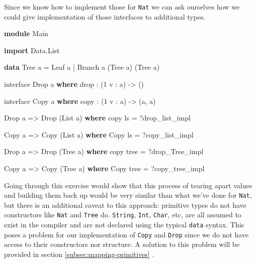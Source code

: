 \documentclass[
]{article}
\newenvironment{Shaded}{}{}
\newcommand{\DataTypeTok}[1]{\textcolor[rgb]{0.56,0.13,0.00}{#1}}
\newcommand{\DecValTok}[1]{\textcolor[rgb]{0.25,0.63,0.44}{#1}}
\newcommand{\FunctionTok}[1]{\textcolor[rgb]{0.02,0.16,0.49}{#1}}
\newcommand{\KeywordTok}[1]{\textcolor[rgb]{0.00,0.44,0.13}{\textbf{#1}}}
\newcommand{\NormalTok}[1]{#1}
\newcommand{\OperatorTok}[1]{\textcolor[rgb]{0.40,0.40,0.40}{#1}}
\newcommand{\OtherTok}[1]{\textcolor[rgb]{0.00,0.44,0.13}{#1}}
\begin{document}
Since we know how to implement those for \texttt{Nat} we can ask
ourselves how we could give implementation of those interfaces to
additional types.

\begin{Shaded}
\begin{Highlighting}[]
\KeywordTok{module} \DataTypeTok{Main}

\KeywordTok{import} \DataTypeTok{Data.List}

\KeywordTok{data} \DataTypeTok{Tree}\NormalTok{ a }\OtherTok{=} \DataTypeTok{Leaf}\NormalTok{ a }\OperatorTok{|} \DataTypeTok{Branch}\NormalTok{ a (}\DataTypeTok{Tree}\NormalTok{ a) (}\DataTypeTok{Tree}\NormalTok{ a)}

\NormalTok{interface }\DataTypeTok{Drop}\NormalTok{ a }\KeywordTok{where}
    \FunctionTok{drop} \OperatorTok{:}\NormalTok{ (}\DecValTok{1}\NormalTok{ v }\OperatorTok{:}\NormalTok{ a) }\OtherTok{{-}\textgreater{}}\NormalTok{ ()}

\NormalTok{interface }\DataTypeTok{Copy}\NormalTok{ a }\KeywordTok{where}
\NormalTok{    copy }\OperatorTok{:}\NormalTok{ (}\DecValTok{1}\NormalTok{ v }\OperatorTok{:}\NormalTok{ a) }\OtherTok{{-}\textgreater{}}\NormalTok{ (a, a)}

\DataTypeTok{Drop}\NormalTok{ a }\OtherTok{=\textgreater{}} \DataTypeTok{Drop}\NormalTok{ (}\DataTypeTok{List}\NormalTok{ a) }\KeywordTok{where}
\NormalTok{    copy ls }\OtherTok{=} \OperatorTok{?}\NormalTok{drop\_list\_impl}

\DataTypeTok{Copy}\NormalTok{ a }\OtherTok{=\textgreater{}} \DataTypeTok{Copy}\NormalTok{ (}\DataTypeTok{List}\NormalTok{ a) }\KeywordTok{where}
    \DataTypeTok{Copy}\NormalTok{ ls }\OtherTok{=} \OperatorTok{?}\NormalTok{copy\_list\_impl}

\DataTypeTok{Drop}\NormalTok{ a }\OtherTok{=\textgreater{}} \DataTypeTok{Drop}\NormalTok{ (}\DataTypeTok{Tree}\NormalTok{ a) }\KeywordTok{where}
\NormalTok{    copy tree }\OtherTok{=} \OperatorTok{?}\NormalTok{drop\_Tree\_impl}

\DataTypeTok{Copy}\NormalTok{ a }\OtherTok{=\textgreater{}} \DataTypeTok{Copy}\NormalTok{ (}\DataTypeTok{Tree}\NormalTok{ a) }\KeywordTok{where}
    \DataTypeTok{Copy}\NormalTok{ tree }\OtherTok{=} \OperatorTok{?}\NormalTok{copy\_tree\_impl}
\end{Highlighting}
\end{Shaded}

Going through this exercise would show that this process of tearing
apart values and building them back up would be very similar than what
we've done for \texttt{Nat}, but there is an additional caveat to this
approach: primitive types do not have constructors like \texttt{Nat} and
\texttt{Tree} do. \texttt{String}, \texttt{Int}, \texttt{Char}, etc, are
all assumed to exist in the compiler and are not declared using the
typical \texttt{data} syntax. This poses a problem for our
implementation of \texttt{Copy} and \texttt{Drop} since we do not have
access to their constructors nor structure. A solution to this problem
will be provided in section \ref{subsec:mapping-primitives} .
\end{document}
